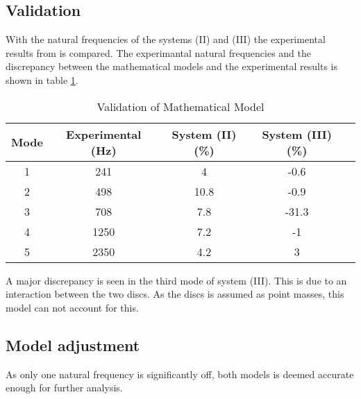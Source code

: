 \subsection{Validation}
With the natural frequencies of the systems (II) and (III) the experimental results from \cite[6]{Problem} is compared. The experimantal natural frequencies and the discrepancy between the mathematical models and the experimental results is shown in table \ref{tab:validation_two_discs}.
\begin{table}[ht]
    \begin{adjustwidth}{-1cm}{-1cm}
    \centering
    \caption{Validation of Mathematical Model}
    \label{tab:validation_two_discs}
    \begin{tabular}{@{}ccccc@{}}
        \toprule
        Mode    &   Experimental (\si{\hertz})    &   System (II) (\si{\percent})    &   System (III) (\si{\percent})  \\ \midrule
        1       &   241     &   4       &   -0.6    \\
        2       &   498     &   10.8    &   -0.9    \\
        3       &   708     &   7.8     &   -31.3   \\
        4       &   1250    &   7.2     &   -1      \\ 
        5       &   2350    &   4.2     &   3       \\ \bottomrule
    \end{tabular}
    \end{adjustwidth}
\end{table}

A major discrepancy is seen in the third mode of system (III). This is due to an interaction between the two discs. As the discs is assumed as point masses, this model can not account for this.

\subsection{Model adjustment}
As only one natural frequency is significantly off, both models is deemed accurate enough for further analysis.

